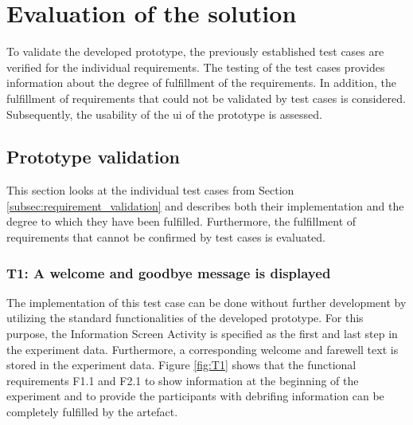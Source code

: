 \newpage\section{Evaluation of the solution}

To validate the developed prototype, the previously established test cases are verified for the individual requirements. The testing of the test cases provides information about the degree of fulfillment of the requirements. In addition, the fulfillment of requirements that could not be validated by test cases is considered. Subsequently, the usability of the \ac{ui} of the prototype is assessed.

\subsection{Prototype validation}
This section looks at the individual test cases from Section \ref{subsec:requirement_validation} and describes both their implementation and the degree to which they have been fulfilled. Furthermore, the fulfillment of requirements that cannot be confirmed by test cases is evaluated. 

\newpage\subsubsection*{T1: A welcome and goodbye message is displayed} 

The implementation of this test case can be done without further development by utilizing the standard functionalities of the developed prototype. For this purpose, the Information Screen Activity is specified as the first and last step in the experiment data. Furthermore, a corresponding welcome and farewell text is stored in the experiment data. Figure \ref{fig:T1} shows that the functional requirements F1.1 and F2.1 to show information at the beginning of the experiment and to provide the participants with debrifing information can be completely fulfilled by the artefact.

\vspace{1.5cm}


